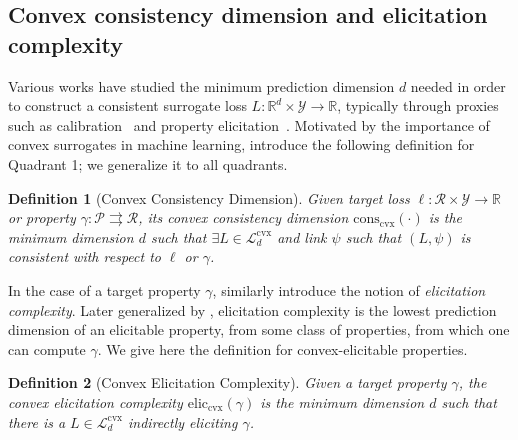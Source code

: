 \documentclass[11pt]{article} %
\newcommand{\Comments}{1}
\newcommand{\mytodo}[2]{\ifnum\Comments=1%
	\todo[linecolor=#1!80!black,backgroundcolor=#1,bordercolor=#1!80!black]{#2}\fi}
\newcommand{\jessiet}[1]{\mytodo{teal!20!white}{JF: #1}}
\newcommand{\btw}[1]{}%
\newcommand{\reals}{\mathbb{R}}
\newcommand{\eliccvx}{\mathrm{elic}_\mathrm{cvx}}
\newcommand{\conscvx}{\mathrm{cons}_\mathrm{cvx}}
\newcommand{\Lcvx}{\mathcal{L}^{\mathrm{cvx}}}
\newcommand{\R}{\mathcal{R}}
\renewcommand{\P}{\mathcal{P}}
\newcommand{\Y}{\mathcal{Y}}
\newcommand{\toto}{\rightrightarrows}
\newtheorem{definition}{Definition}
\begin{document}
\subsection{Convex consistency dimension and elicitation complexity}\label{subsec:complexity}

Various works have studied the minimum prediction dimension $d$ needed in order to construct a consistent surrogate loss $L: \reals^d \times \Y \to \reals$, typically through proxies such as calibration~\citep{steinwart2008support,agarwal2015consistent,ramaswamy2016convex} and property elicitation~\citep{frongillo2015vector-valued,fissler2016higher,frongillo2020elicitation}.
Motivated by the importance of convex surrogates in machine learning, \citet{ramaswamy2016convex}
introduce the following definition for Quadrant 1; we generalize it to all quadrants.

\begin{definition}[Convex Consistency Dimension]\label{def:cvx-consistency-dim}
  Given target loss $\ell:\R \times\Y \to \reals$ or property $\gamma: \P \toto \R$, its \emph{convex consistency dimension} $\conscvx(\cdot)$ is the minimum dimension $d$ such that $\exists L \in \Lcvx_d$ and link $\psi$ such that $(L,\psi)$ is consistent with respect to $\ell$ or $\gamma$.
\end{definition}

In the case of a target property $\gamma$, \citet{lambert2008eliciting} similarly introduce the notion of \emph{elicitation complexity}.
Later generalized by \citet{frongillo2020elicitation}, elicitation complexity is the lowest prediction dimension of an elicitable property, from some class of properties, from which one can compute $\gamma$.
We give here the definition for convex-elicitable properties.

\begin{definition}[Convex Elicitation Complexity]\label{def:cvx-elic-complex}
	Given a target property $\gamma$, the \emph{convex elicitation complexity} $\eliccvx(\gamma)$ is the minimum dimension $d$ such that there is a $L \in \Lcvx_d$ indirectly eliciting $\gamma$.
\end{definition}
\end{document}
